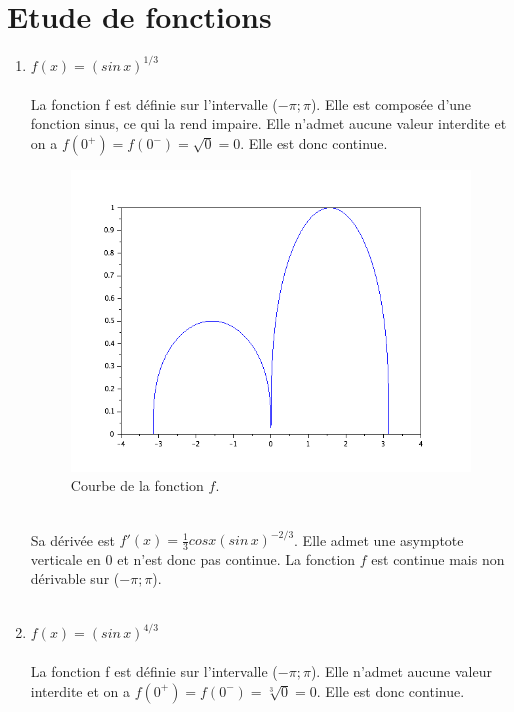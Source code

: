 \documentclass[a4paper,12pt]{report}
\begin{document}
\chapter{Etude de fonctions}
	\begin{enumerate}
	\item $f(x)=(sin\,x)^{1/3}$ \\ \\
	La fonction f est définie sur l'intervalle ($-\pi;\pi$). Elle est compos\'ee d'une fonction sinus, ce qui la rend impaire. Elle n'admet aucune valeur interdite et on a $f(0^+)=f(0^-)=\sqrt{0}=0$. Elle est donc continue.
	\begin{figure}[h!]
		\centering
		\includegraphics[scale=0.6]{ex2_fig1.png}
		\caption{\label{figure1}Courbe de la fonction $f$.}
		\end{figure}
		\\
	Sa d\'eriv\'ee est $f'(x)=\frac{1}{3} cos x (sin\,x)^{-2/3}$. Elle admet une asymptote verticale en $0$ et n'est donc pas continue.
	La fonction $f$ est continue mais non d\'erivable sur ($-\pi;\pi$).\\ \\
	\item $f(x)=(sin\,x)^{4/3}$ \\ \\
	La fonction f est définie sur l'intervalle ($-\pi;\pi$). Elle n'admet aucune valeur interdite et on a $f(0^+)=f(0^-)=\sqrt[3]{0}=0$. Elle est donc continue.
	\begin{figure}[h!]
		\centering

\end{figure}
\end{enumerate}
\end{document}
